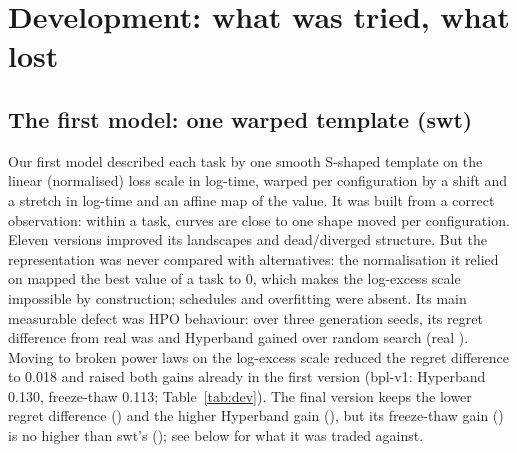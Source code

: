 \documentclass[10pt]{article}
\newcommand{\swt}{\textsf{swt}}
\begin{document}
\section{Development: what was tried, what lost}
\label{sec:dev}

\subsection{The first model: one warped template (\swt{})}
\label{sec:swt}
Our first model described each task by one smooth S-shaped template on the linear (normalised) loss scale in
log-time, warped per configuration by a shift and a stretch in log-time and an affine map of the value. It was
built from a correct observation: within a task, curves are close to one shape moved per configuration. Eleven
versions improved its landscapes and dead/diverged structure. But the representation was never compared with
alternatives: the normalisation it relied on mapped the best value of a task to 0, which makes the log-excess scale
impossible by construction; schedules and overfitting were absent. Its main measurable defect was HPO behaviour: over three generation seeds, its regret difference from real was
\swtMAE{} and Hyperband gained \swtHB{} over random search (real \realHB{}). Moving to broken power laws on the
log-excess scale reduced the regret difference to 0.018 and raised both gains already in the first version (bpl-v1:
Hyperband 0.130, freeze-thaw 0.113; Table~\ref{tab:dev}). The final version keeps the lower regret difference
(\bplMAE{}) and the higher Hyperband gain (\bplHB{}), but its freeze-thaw gain (\bplFT{}) is no higher than
\swt{}'s (\swtFT{}); see below for what it was traded against.
\end{document}
